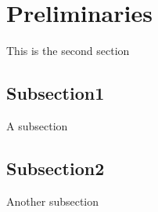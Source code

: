 \section{Preliminaries}\label{sec:prelim}
This is the second section

\subsection{Subsection1}
A subsection




\subsection{Subsection2}
Another subsection







